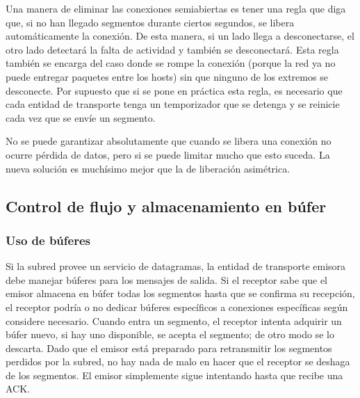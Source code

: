 \documentclass[10pt,a4paper]{report}
\begin{document}
	\par Una manera de eliminar las conexiones semiabiertas es tener una regla que diga que, si no han llegado segmentos durante ciertos segundos, se libera automáticamente la conexión. De esta manera, si un lado llega a desconectarse, el otro lado detectará la falta de actividad y también se desconectará. Esta regla también se encarga del caso donde se rompe la conexión (porque la red ya no puede entregar paquetes entre los hosts) sin que ninguno de los extremos se desconecte. Por supuesto que si se pone en práctica esta regla, es necesario que cada entidad de transporte tenga un temporizador que se detenga y se reinicie cada vez que se envíe un segmento.

	\par No se puede garantizar absolutamente que cuando se libera una conexión no ocurre pérdida de datos, pero si se puede limitar mucho que esto suceda. La nueva solución es muchísimo mejor que la de liberación asimétrica.

\subsection{Control de flujo y almacenamiento en búfer}

\subsubsection{Uso de búferes}

	\par Si la subred provee un servicio de datagramas, la entidad de transporte emisora debe manejar búferes para los mensajes de salida. Si el receptor sabe que el emisor almacena en búfer todas los segmentos hasta que se confirma su recepción, el receptor podría o no dedicar búferes específicos a conexiones específicas según considere necesario. Cuando entra un segmento, el receptor intenta adquirir un búfer nuevo, si hay uno disponible, se acepta el segmento; de otro modo se lo descarta. Dado que el emisor está preparado para retransmitir los segmentos perdidos por la subred, no hay nada de malo en hacer que el receptor se deshaga de los segmentos. El emisor simplemente sigue intentando hasta que recibe una ACK.
	
\end{document}

